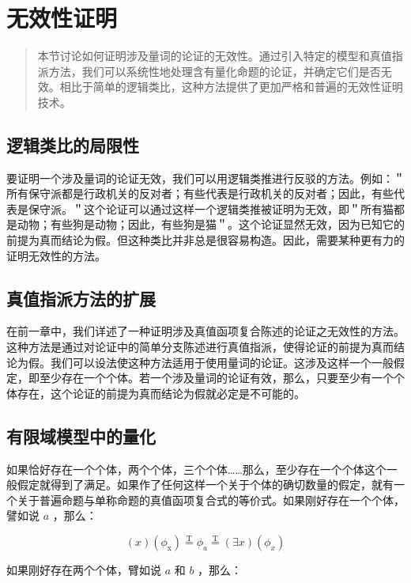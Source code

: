 \section{无效性证明}

\begin{quotation}
本节讨论如何证明涉及量词的论证的无效性。通过引入特定的模型和真值指派方法，我们可以系统性地处理含有量化命题的论证，并确定它们是否无效。相比于简单的逻辑类比，这种方法提供了更加严格和普遍的无效性证明技术。
\end{quotation}

\subsection{逻辑类比的局限性}

要证明一个涉及量词的论证无效，我们可以用逻辑类推进行反驳的方法。例如：＂所有保守派都是行政机关的反对者；有些代表是行政机关的反对者；因此，有些代表是保守派。＂这个论证可以通过这样一个逻辑类推被证明为无效，即＂所有猫都是动物；有些狗是动物；因此，有些狗是猫＂。这个论证显然无效，因为已知它的前提为真而结论为假。但这种类比并非总是很容易构造。因此，需要某种更有力的证明无效性的方法。

\subsection{真值指派方法的扩展}

在前一章中，我们详述了一种证明涉及真值函项复合陈述的论证之无效性的方法。这种方法是通过对论证中的简单分支陈述进行真值指派，使得论证的前提为真而结论为假。我们可以设法使这种方法适用于使用量词的论证。这涉及这样一个一般假定，即至少存在一个个体。若一个涉及量词的论证有效，那么，只要至少有一个个体存在，这个论证的前提为真而结论为假就必定是不可能的。

\subsection{有限域模型中的量化}

如果恰好存在一个个体，两个个体，三个个体……那么，至少存在一个个体这个一般假定就得到了满足。如果作了任何这样一个关于个体的确切数量的假定，就有一个关于普遍命题与单称命题的真值函项复合式的等价式。如果刚好存在一个个体，譬如说 $a$ ，那么：

$$
(x)\left(\phi_{\mathrm{x}}\right) \stackrel{\mathrm{T}}{=} \phi_{a} \stackrel{\mathrm{T}}{=}(\exists x)\left(\phi_{x}\right)
$$

如果刚好存在两个个体，臂如说 $a$ 和 $b$ ，那么：

